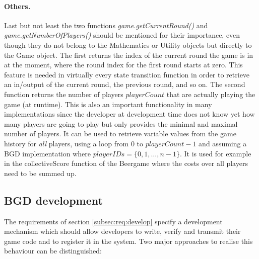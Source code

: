\paragraph{Others.} Last but not least the two functions \textit{game.getCurrentRound()} and \newline \textit{game.getNumberOfPlayers()} should be mentioned for their importance, even though they do not belong to the Mathematics or Utility objects but directly to the Game object. The first returns the index of the current round the game is in at the moment, where the round index for the first round starts at zero. This feature is needed in virtually every state transition function in order to retrieve an in/output of the current round, the previous round, and so on. The second function returns the number of players $playerCount$ that are actually playing the game (at runtime). This is also an important functionality in many implementations since the developer at development time does not know yet how many players are going to play but only provides the minimal and maximal number of players. It can be used to retrieve variable values from the game history for \textit{all} players, using a loop from 0 to $playerCount-1$ and assuming a BGD implementation where $playerIDs =\{ 0,1,\dots, n-1\}$. It is used for example in the collectiveScore function of the Beergame where the costs over all players need to be summed up. 

\subsection{BGD development}
\label{subsec:bgd:develop}

The requirements of section \ref{subsec:req:develop} specify a development mechanism which should allow developers to write, verify and transmit their game code and to register it in the system. Two major approaches to realise this behaviour can be distinguished:

